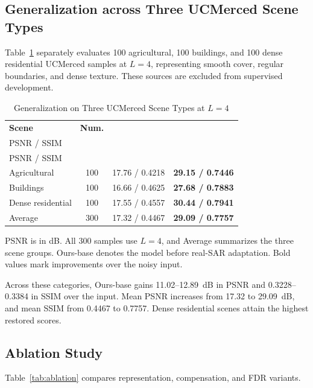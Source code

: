 \documentclass[journal]{IEEEtran}
\begin{document}
\subsection{Generalization across Three UCMerced Scene Types}
Table~\ref{tab:ucm_scenes} separately evaluates 100 agricultural, 100 buildings, and 100 dense residential UCMerced samples at \(L=4\), representing smooth cover, regular boundaries, and dense texture. These sources are excluded from supervised development.

\begin{table}[!t]
\caption{Generalization on Three UCMerced Scene Types at \(L=4\)}
\label{tab:ucm_scenes}
\centering
\footnotesize
\setlength{\tabcolsep}{3.0pt}
\renewcommand{\arraystretch}{1.08}
\begin{tabular*}{\columnwidth}{@{\extracolsep{\fill}}lccc@{}}
\toprule
\textbf{Scene} & \textbf{Num.} &
\shortstack{\textbf{Noisy}\\PSNR / SSIM} &
\shortstack{\textbf{Ours-base}\\PSNR / SSIM} \\
\midrule
Agricultural & 100 & 17.76 / 0.4218 & \textbf{29.15 / 0.7446} \\
Buildings    & 100 & 16.66 / 0.4625 & \textbf{27.68 / 0.7883} \\
Dense residential & 100 & 17.55 / 0.4557 & \textbf{30.44 / 0.7941} \\
\midrule
Average      & 300 & 17.32 / 0.4467 & \textbf{29.09 / 0.7757} \\
\bottomrule
\end{tabular*}
\vspace{1pt}
\parbox{\columnwidth}{\footnotesize PSNR is in dB. All 300 samples use \(L=4\), and Average summarizes the three scene groups. Ours-base denotes the model before real-SAR adaptation. Bold values mark improvements over the noisy input.}
\end{table}

Across these categories, Ours-base gains 11.02--12.89~dB in PSNR and 0.3228--0.3384 in SSIM over the input. Mean PSNR increases from 17.32 to 29.09~dB, and mean SSIM from 0.4467 to 0.7757. Dense residential scenes attain the highest restored scores.

\subsection{Ablation Study}
Table~\ref{tab:ablation} compares representation, compensation, and FDR variants.
\end{document}
